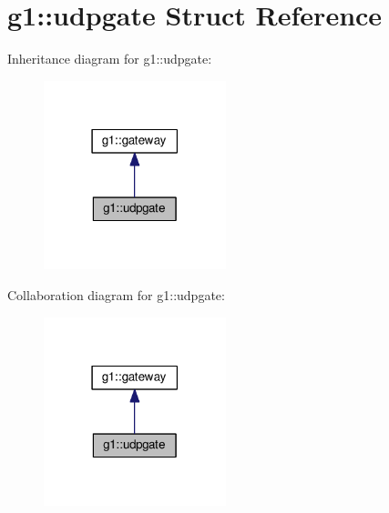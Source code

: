 \hypertarget{structg1_1_1udpgate}{}\section{g1\+:\+:udpgate Struct Reference}
\label{structg1_1_1udpgate}


Inheritance diagram for g1\+:\+:udpgate\+:
\nopagebreak
\begin{figure}[H]
\begin{center}
\leavevmode
\includegraphics[width=150pt]{structg1_1_1udpgate__inherit__graph}
\end{center}
\end{figure}


Collaboration diagram for g1\+:\+:udpgate\+:
\nopagebreak
\begin{figure}[H]
\begin{center}
\leavevmode
\includegraphics[width=150pt]{structg1_1_1udpgate__coll__graph}
\end{center}
\end{figure}

